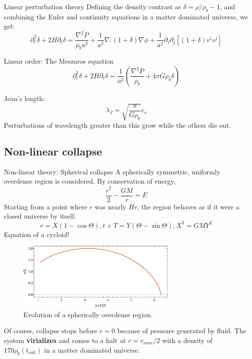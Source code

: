 \documentclass{beamer}
\begin{document}
\begin{frame}{Linear perturbation theory}
	Defining the density contrast as $\delta=\rho/\rho_b-1$, and combining the Euler and continuity equations in a matter dominated universe, we get:
	\begin{equation}
	\partial_t^2\delta+2H\partial_t\delta=\frac{\nabla^2P}{\rho_ba^2}+\frac{1}{a^2}\nabla.(1+\delta)\nabla\phi+\frac{1}{a^2}\partial_i\partial_j[(1+\delta)v^iv^j]
	\label{eq:newt-perturb-exact}
	\end{equation}
	\begin{block}{Linear order: The Meszaros equation}
		\begin{equation}
		\partial_t^2\delta+2H\partial_t\delta=\frac{1}{a^2}(\frac{\nabla^2P}{\rho_b}+4\pi G\rho_b\delta)
		\label{eq:meszaros}
		\end{equation}
	\end{block}
	Jean's length:
	\begin{equation}
	\lambda_J=\sqrt{\frac{\pi}{G\rho_b}}c_s
	\label{ew:JeansLength}
	\end{equation}
	Perturbations of wavelength greater than this grow while the others die out.
\end{frame}
\subsection{Non-linear collapse}
\begin{frame}[allowframebreaks]{Non-linear theory: Spherical collapse}
	A spherically symmetric, uniformly overdense region is considered. By conservation of energy,
	\begin{equation}
	\frac{\dot{r}^2}{2}-\frac{GM}{r}=E
	\label{eq:energy_sphere}
	\end{equation}
	Starting from a point where $\dot{r}$ was nearly $Hr$, the region behaves as if it were a closed universe by itself.
	$$
	r=X(1-\cos\Theta),t+T=Y(\Theta-\sin\Theta),X^3=GMY^2
	$$
	Equation of a cycloid!
	\begin{figure}[h]
		\centering
		\includegraphics[width=0.7\textwidth]{spherical.eps}
		\caption{\footnotesize Evolution of a spherically overdense region.}
		\label{fig:sphere-cycloid}
	\end{figure}
	Of course, collapse stops before $r=0$ because of pressure generated by fluid. The system \textbf{virializes} and comes to a halt at $r=r_{max}/2$ with a density of $170\rho_b(t_{coll})$ in a matter dominated universe. 
\end{frame}
\end{document}

